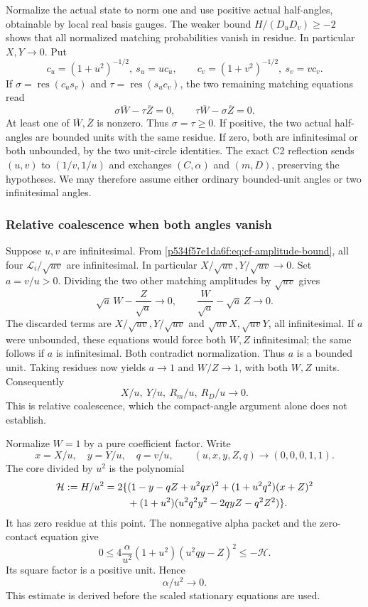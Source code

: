 Normalize the actual state to norm one and use positive actual
half-angles, obtainable by local real basis gauges. The weaker
bound \(H/(D_uD_v)\ge-2\) shows that all normalized matching
probabilities vanish in residue. In particular \(X,Y\to0\).
Put
\[
c_u=(1+u^2)^{-1/2},\ s_u=uc_u,\qquad
c_v=(1+v^2)^{-1/2},\ s_v=vc_v.
\]
If \(\sigma=\operatorname{res}(c_us_v)\) and
\(\tau=\operatorname{res}(s_uc_v)\), the two remaining matching
equations read
\[
\sigma\overline W-\tau\overline Z=0,\qquad
\tau\overline W-\sigma\overline Z=0.
\]
At least one of \(\overline W,\overline Z\) is nonzero. Thus
\(\sigma=\tau\ge0\). If positive, the two actual half-angles are
bounded units with the same residue. If zero, both are infinitesimal
or both unbounded, by the two unit-circle identities. The exact C2
reflection sends \((u,v)\) to \((1/v,1/u)\) and exchanges
\((C,\alpha)\) and \((m,D)\), preserving the hypotheses. We may
therefore assume either ordinary bounded-unit angles or two
infinitesimal angles.

\subsubsection*{Relative coalescence when both angles vanish}
Suppose \(u,v\) are infinitesimal. From
\eqref{p534f57e1da6f:eq:cf-amplitude-bound}, all four
\(\mathcal L_i/\sqrt{uv}\) are infinitesimal. In particular
\(X/\sqrt{uv},Y/\sqrt{uv}\to0\). Set \(a=v/u>0\).
Dividing the two other matching amplitudes by \(\sqrt{uv}\) gives
\[
\sqrt a\,W-\frac Z{\sqrt a}\longrightarrow0,\qquad
\frac W{\sqrt a}-\sqrt a\,Z\longrightarrow0.
\]
The discarded terms are \(X/\sqrt{uv},Y/\sqrt{uv}\) and
\(\sqrt{uv}X,\sqrt{uv}Y\), all infinitesimal.
If \(a\) were unbounded, these equations would force both \(W,Z\)
infinitesimal; the same follows if \(a\) is infinitesimal.
Both contradict normalization. Thus \(a\) is a bounded unit.
Taking residues now yields \(a\to1\) and \(W/Z\to1\), with
both \(W,Z\) units. Consequently
\[
                  X/u,\ Y/u,\ R_m/u,\ R_D/u\longrightarrow0.
\]
This is relative coalescence, which the compact-angle argument alone
does not establish.

Normalize \(W=1\) by a pure coefficient factor. Write
\[
x=X/u,\quad y=Y/u,\quad q=v/u,\qquad
(u,x,y,Z,q)\longrightarrow(0,0,0,1,1).
\]
The core divided by \(u^2\) is the polynomial
\begin{align}
\mathcal H:=H/u^2=2\{&
(1-y-qZ+u^2qx)^2+(1+u^2q^2)(x+Z)^2 \notag\\
&+(1+u^2)(u^2q^2y^2-2qyZ-q^2Z^2)\}. \label{p534f57e1da6f:eq:cf-scaled-core}
\end{align}
It has zero residue at this point. The nonnegative alpha packet and
the zero-contact equation give
\[
0\le4\frac{\alpha}{u^2}(1+u^2)(u^2qy-Z)^2
                   \le-\mathcal H.
\]
Its square factor is a positive unit. Hence
\begin{equation}
                         \alpha/u^2\longrightarrow0. \label{p534f57e1da6f:eq:cf-alpha-scale}
\end{equation}
This estimate is derived before the scaled stationary equations are used.

